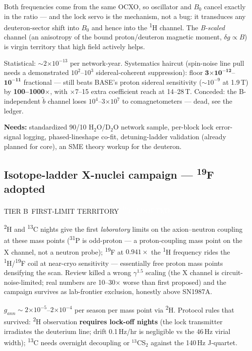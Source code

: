 \documentclass[11pt]{article}
\newcommand{\chip}[3]{\colorbox{#1}{\textcolor{#2}{\scriptsize\textsf{\vphantom{Ag}#3}}}}
\newcommand{\cflag}[1]{\chip{accent}{white}{#1}}
\newcommand{\cfirst}[1]{\chip{gatesoft}{gateink}{#1}}
\newcommand{\ctier}[1]{\chip{numbg}{inkfaint}{#1}}
\newcommand{\needs}[1]{{\small\textcolor{inkfaint}{\textbf{Needs:} #1}}}
\newcommand{\hnmr}{\textsuperscript{1}H}
\newcommand{\dnmr}{\textsuperscript{2}H}
\newcommand{\fnmr}{\textsuperscript{19}F}
\newcommand{\cnmr}{\textsuperscript{13}C}
\newcommand{\pnmr}{\textsuperscript{31}P}
\newcommand{\e}[1]{\ensuremath{\times10^{#1}}}
\begin{document}
\medskip\noindent
Both frequencies come from the same OCXO, so oscillator and $B_0$ cancel exactly
in the ratio --- and the lock servo is the mechanism, not a bug: it transduces
any deuteron-sector shift into $B_0$ and hence into the \hnmr{} channel. The
\emph{B-scaled} channel (an anisotropy of the bound proton/deuteron magnetic
moment, $\delta g \propto B$) is virgin territory that high field actively helps.

\begin{numbers}\small
Statistical: ${\sim}2\e{-13}$ per network-year. Systematics haircut (spin-noise
line pull needs a demonstrated $10^{2}$--$10^{3}$ sidereal-coherent
suppression): floor $\mathbf{3\e{-12}}$--$\mathbf{10^{-11}}$ fractional ---
still beats BASE's proton sidereal sensitivity (${\sim}10^{-9}$ at 1.9\,T) by
\textbf{100--1000$\times$}, with $\times$7--15 extra coefficient reach at
14--28\,T. Conceded: the B-independent $\tilde b$ channel loses $10^{4}$--$3\e{7}$
to comagnetometers --- dead, see the ledger.
\end{numbers}

\needs{standardized 90/10 H$_2$O/D$_2$O network sample, per-block lock
error-signal logging, phased-lineshape co-fit, detuning-ladder validation
(already planned for core), an SME theory workup for the deuteron.}

\subsection{Isotope-ladder X-nuclei campaign --- \fnmr{} adopted}
\ctier{TIER B}\ \cfirst{FIRST-LIMIT TERRITORY}\ \cflag{\textsuperscript{19}F ADOPTED}

\medskip\noindent
\dnmr{} and \cnmr{} nights give the first \emph{laboratory} limits
on the axion--neutron coupling at these mass points (\pnmr{} is
odd-proton --- a proton-coupling mass point on the X channel, not a
neutron probe); \fnmr{} at $0.941\times$
the \hnmr{} frequency rides the \hnmr/\fnmr{} coil at near-cryo sensitivity ---
essentially free proton mass points densifying the scan. Review killed a wrong
$\gamma^{1.5}$ scaling (the X channel is circuit-noise-limited; real numbers are
10--30$\times$ worse than first proposed) and the campaign survives as
lab-frontier exclusion, honestly above SN1987A.

\begin{numbers}\small
$g_{ann}\sim2\e{-5}$--$2\e{-4}$ per season per mass point via \dnmr.
Protocol rules that survived: \dnmr{} observation \textbf{requires lock-off
nights} (the lock transmitter irradiates the deuterium line; drift 0.1\,Hz/hr is
negligible vs the 46\,Hz virial width); \cnmr{} needs overnight decoupling or
$^{13}$CS$_2$ against the 140\,Hz J-quartet.
\end{numbers}
\end{document}
